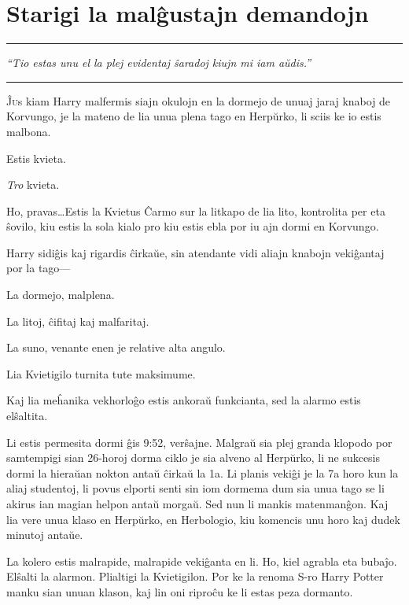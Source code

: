 \chapter{Starigi la malĝustajn demandojn}

\begin{center}\rule{3in}{0.4pt}\end{center}

\emph{``Tio estas unu el la plej evidentaj ŝaradoj kiujn mi iam aŭdis.''}  

\begin{center}\rule{3in}{0.4pt}\end{center}

\lettrine{Ĵ}us kiam Harry malfermis siajn okulojn en la dormejo
de unuaj jaraj knaboj de Korvungo, je la mateno de lia unua plena
tago en Herpŭrko, li sciis ke io estis malbona.

Estis kvieta.

\emph{Tro} kvieta.

Ho, pravas\ldots Estis la Kvietus Ĉarmo sur la litkapo de lia lito,
kontrolita per eta ŝovilo, kiu estis la sola kialo pro kiu estis ebla
por iu ajn dormi en Korvungo.

Harry sidiĝis kaj rigardis ĉirkaŭe, sin atendante vidi aliajn knabojn vekiĝantaj
por la tago—

La dormejo, malplena.

La litoj, ĉifitaj kaj malfaritaj.

La suno, venante enen je relative alta angulo.

Lia Kvietigilo turnita tute maksimume.

Kaj lia meĥanika vekhorloĝo estis ankoraŭ funkcianta, sed la alarmo
estis elŝaltita.

Li estis permesita dormi ĝis 9:52, verŝajne. Malgraŭ sia plej granda
klopodo por samtempigi sian 26-horoj dorma ciklo je sia alveno al
Herpŭrko, li ne sukcesis dormi la hieraŭan nokton antaŭ ĉirkaŭ la 1a.
Li planis vekiĝi je la 7a horo kun la aliaj studentoj, li povus
elporti senti sin iom dormema dum sia unua tago se li akirus ian
magian helpon antaŭ morgaŭ. Sed nun li mankis matenmanĝon. Kaj lia
vere unua klaso en Herpŭrko, en Herbologio, kiu komencis unu horo kaj
dudek minutoj antaŭe.

La kolero estis malrapide, malrapide vekiĝanta en li. Ho, kiel agrabla
eta bubaĵo. Elŝalti la alarmon. Plialtigi la Kvietigilon. Por ke la
renoma S-ro Harry Potter manku sian unuan klason, kaj lin oni riproĉu
ke li estas peza dormanto.

